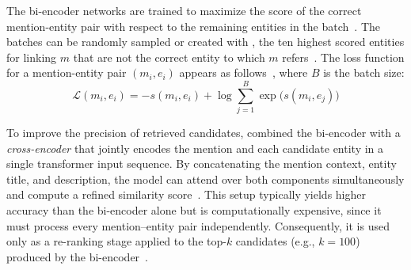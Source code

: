 The bi-encoder networks are trained to maximize the score of the correct mention-entity pair with respect to the remaining entities in the batch~\cite{blink}. The batches can be randomly sampled or created with , \eg the ten highest scored entities for linking $m$ that are not the correct entity to which $m$ refers~\cite{blink}. The loss function for a mention-entity pair $(m_i, e_i)$ appears as follows~\cite{blink}, where $B$ is the batch size:
\begin{equation}
\mathcal{L}(m_i, e_i) = -s(m_i, e_i) + \log \sum_{j=1}^{B} \exp \big( s(m_i, e_j) \big)
\end{equation}


To improve the precision of retrieved candidates, \textcite{blink} combined the bi-encoder with a \emph{cross-encoder} that jointly encodes the mention and each candidate entity in a single transformer input sequence. By concatenating the mention context, entity title, and description, the model can attend over both components simultaneously and compute a refined similarity score~\cite{blink,logeswaran-etal-2019-zero,Humeau2020Poly-encoders}.
This setup typically yields higher accuracy than the bi-encoder alone but is computationally expensive, since it must process every mention--entity pair independently. Consequently, it is used only as a re-ranking stage applied to the top-$k$ candidates (e.g., $k=100$) produced by the bi-encoder~\cite{blink,Heist2023nastylinker}.


